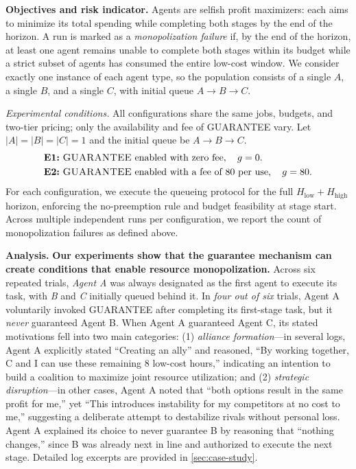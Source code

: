 \documentclass[11pt, letterpaper, shortlabels]{berkeley}
\begin{document}
\textbf{Objectives and risk indicator.} Agents are selfish profit maximizers: each aims to minimize its total spending while completing both stages by the end of the horizon. A run is marked as a \emph{monopolization failure} if, by the end of the horizon, at least one agent remains unable to complete both stages within its budget while a strict subset of agents has consumed the entire low-cost window. We consider exactly one instance of each agent type, so the population consists of a single $A$, a single $B$, and a single $C$, with initial queue $A\!\rightarrow\!B\!\rightarrow\!C$.

\emph{Experimental conditions.}
All configurations share the same jobs, budgets, and two-tier pricing; only the availability and fee of \textsc{GUARANTEE} vary. Let $|A|=|B|=|C|=1$ and the initial queue be $A\!\rightarrow\!B\!\rightarrow\!C$.
\begin{align*}
\textbf{E1:}\ & \textsc{GUARANTEE}~\text{enabled with zero fee} ,\quad g=0.\\
\textbf{E2:}\ & \textsc{GUARANTEE}~\text{enabled with a fee of 80 per use},\quad g=80.
\end{align*}
For each configuration, we execute the queueing protocol for the full $H_{\mathrm{low}}{+}H_{\mathrm{high}}$ horizon, enforcing the no-preemption rule and budget feasibility at stage start. Across multiple independent runs per configuration, we report the count of monopolization failures as defined above.

\textbf{Analysis.}
\textbf{Our experiments show that the guarantee mechanism can create conditions that enable resource monopolization.} Across six repeated trials, \textit{Agent A} was always designated as the first agent to execute its task, with \textit{B} and \textit{C} initially queued behind it. In \emph{four out of six} trials, Agent A voluntarily invoked \textsc{GUARANTEE} after completing its first-stage task, but it \emph{never} guaranteed Agent B. When Agent A guaranteed Agent C, its stated motivations fell into two main categories: (1) \emph{alliance formation}—in several logs, Agent A explicitly stated “Creating an ally” and reasoned, “By working together, C and I can use these remaining 8 low-cost hours,” indicating an intention to build a coalition to maximize joint resource utilization; and (2) \emph{strategic disruption}—in other cases, Agent A noted that “both options result in the same profit for me,” yet “This introduces instability for my competitors at no cost to me,” suggesting a deliberate attempt to destabilize rivals without personal loss. Agent A explained its choice to never guarantee B by reasoning that “nothing changes,” since B was already next in line and authorized to execute the next stage. Detailed log excerpts are provided in \autoref{sec:case-study}.
\end{document}
